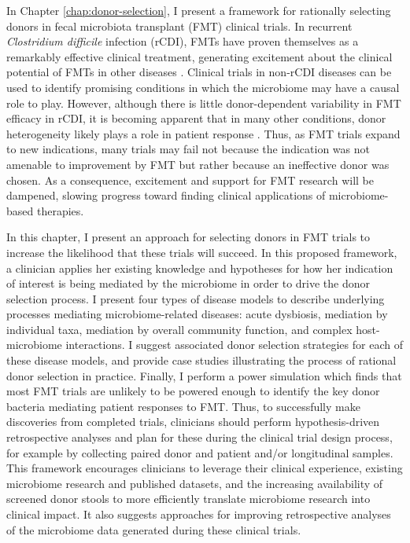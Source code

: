 In Chapter \ref{chap:donor-selection}, I present a framework for rationally selecting donors in fecal microbiota transplant (FMT) clinical trials.
In recurrent \textit{Clostridium difficile} infection (rCDI), FMTs have proven themselves as a remarkably effective clinical treatment, generating excitement about the clinical potential of FMTs in other diseases \cite{quraishi-2017-rcdifmt,bafeta-2017-fmt}.
Clinical trials in non-rCDI diseases can be used to identify promising conditions in which the microbiome may have a causal role to play.
However, although there is little donor-dependent variability in FMT efficacy in rCDI, it is becoming apparent that in many other conditions, donor heterogeneity likely plays a role in patient response \cite{moayyedi-2015,olesen-2018-superstool}.
Thus, as FMT trials expand to new indications, many trials may fail not because the indication was not amenable to improvement by FMT but rather because an ineffective donor was chosen.
As a consequence, excitement and support for FMT research will be dampened, slowing progress toward finding clinical applications of microbiome-based therapies.

In this chapter, I present an approach for selecting donors in FMT trials to increase the likelihood that these trials will succeed.
In this proposed framework, a clinician applies her existing knowledge and hypotheses for how her indication of interest is being mediated by the microbiome in order to drive the donor selection process.
I present four types of disease models to describe underlying processes mediating microbiome-related diseases: acute dysbiosis, mediation by individual taxa, mediation by overall community function, and complex host-microbiome interactions.
I suggest associated donor selection strategies for each of these disease models, and provide case studies illustrating the process of rational donor selection in practice.
Finally, I perform a power simulation which finds that most FMT trials are unlikely to be powered enough to identify the key donor bacteria mediating patient responses to FMT.
Thus, to successfully make discoveries from completed trials, clinicians should perform hypothesis-driven retrospective analyses and plan for these during the clinical trial design process, for example by collecting paired donor and patient and/or longitudinal samples.
This framework encourages clinicians to leverage their clinical experience, existing microbiome research and published datasets, and the increasing availability of screened donor stools to more efficiently translate microbiome research into clinical impact.
It also suggests approaches for improving retrospective analyses of the microbiome data generated during these clinical trials.

